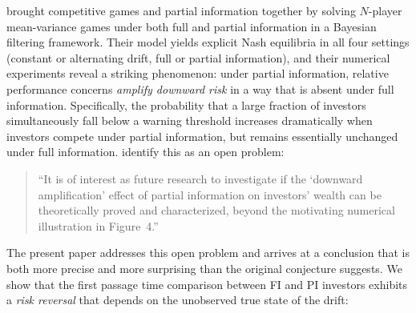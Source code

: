 \documentclass[12pt]{article}
\theoremstyle{remark}
\theoremstyle{definition}
\begin{document}
\citet{HuangSun2025} brought competitive games and partial information
together by solving $N$-player mean-variance games under both full and
partial information in a Bayesian filtering framework.
Their model yields explicit Nash equilibria in all four settings
(constant or alternating drift, full or partial information),
and their numerical experiments reveal a striking phenomenon:
under partial information, relative performance concerns
\emph{amplify downward risk} in a way that is absent under full
information.
Specifically, the probability that a large fraction of investors
simultaneously fall below a warning threshold increases dramatically
when investors compete under partial information, but remains
essentially unchanged under full information.
\citet{HuangSun2025} identify this as an open problem:
\begin{quote}
``It is of interest as future research to investigate if the
`downward amplification' effect of partial information on investors'
wealth can be theoretically proved and characterized, beyond the
motivating numerical illustration in Figure~4.''
\end{quote}

The present paper addresses this open problem and arrives at a
conclusion that is both more precise and more surprising than the
original conjecture suggests.
We show that the first passage time comparison between FI and PI
investors exhibits a \emph{risk reversal} that depends on the
unobserved true state of the drift:
\end{document}
